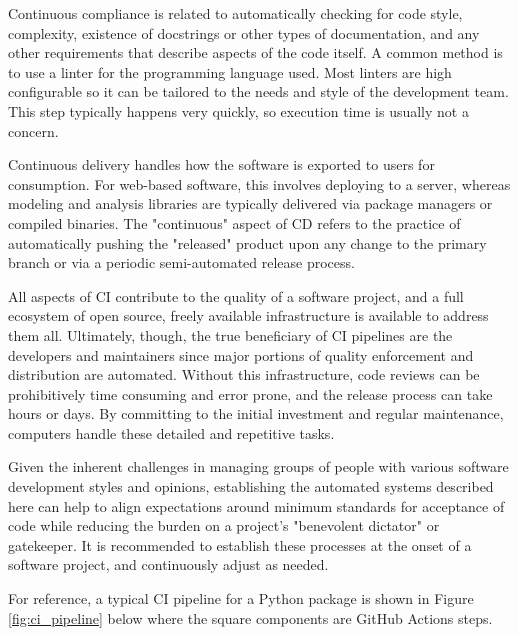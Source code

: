 \documentclass[]{nrel}
\begin{document}
Continuous compliance is related to automatically checking for code style, complexity,
existence of docstrings or other types of documentation, and any other requirements
that describe aspects of the code itself.
A common method is to use a linter for the programming language used.
Most linters are high configurable so it can be tailored to the needs and style of
the development team.
This step typically happens very quickly, so execution time is usually not a concern.

Continuous delivery handles how the software is exported to users for consumption.
For web-based software, this involves deploying to a server, whereas modeling and analysis
libraries are typically delivered via package managers or compiled binaries.
The "continuous" aspect of CD refers to the practice of automatically pushing the
"released" product upon any change to the primary branch or via a periodic semi-automated
release process.

All aspects of CI contribute to the quality of a software project, and a full ecosystem
of open source, freely available infrastructure is available to address them all.
Ultimately, though, the true beneficiary of CI pipelines are the developers and maintainers
since major portions of quality enforcement and distribution are automated.
Without this infrastructure, code reviews can be prohibitively time consuming and error prone,
and the release process can take hours or days.
By committing to the initial investment and regular maintenance, computers handle
these detailed and repetitive tasks.

Given the inherent challenges in managing groups of people with various software
development styles and opinions, establishing the automated systems described here
can help to align expectations around minimum standards for acceptance of code while
reducing the burden on a project's "benevolent dictator" or gatekeeper.
It is recommended to establish these processes at the onset of a software project, and
continuously adjust as needed.

For reference, a typical CI pipeline for a Python package is shown in Figure \ref{fig:ci_pipeline} below where the square
components are GitHub Actions steps.
\end{document}
